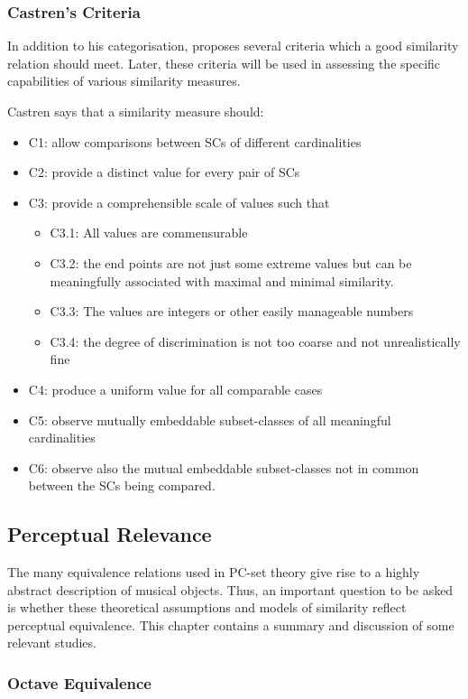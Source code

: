 \documentclass{article}
\begin{document}
\subsubsection{Castren's Criteria}
\label{sec-3-4-3}

In addition to his categorisation, \citet{Castren1994} proposes several
criteria which a good similarity relation should meet. Later, these
criteria will be used in assessing the specific capabilities of
various similarity measures. 

Castren says that a similarity measure should:
\begin{itemize}
\item C1: allow comparisons between SCs of different cardinalities
\item C2: provide a distinct value for every pair of SCs
\item C3: provide a comprehensible scale of values such that
\begin{itemize}
\item C3.1: All values are commensurable
\item C3.2: the end points are not just some extreme values but can be
    meaningfully associated with maximal and minimal similarity.
\item C3.3: The values are integers or other easily manageable numbers
\item C3.4: the degree of discrimination is not too coarse and not
    unrealistically fine
\end{itemize}
\item C4: produce a uniform value for all comparable cases
\item C5: observe mutually embeddable subset-classes of all meaningful
  cardinalities
\item C6: observe also the mutual embeddable subset-classes not in common
  between the SCs being compared.
\end{itemize}
\subsection{Perceptual Relevance}
\label{sec-3-5}

The many equivalence relations used in PC-set theory give rise to a
highly abstract description of musical objects. Thus, an important
question to be asked is whether these theoretical assumptions and
models of similarity reflect perceptual equivalence. This chapter
contains a summary and discussion of some relevant studies.
\subsubsection{Octave Equivalence}
\label{sec-3-5-1}
\end{document}
